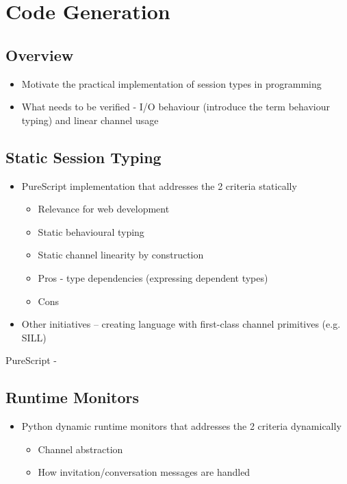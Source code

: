 \section{Code Generation}

\subsection{Overview}
\begin{itemize}
\item Motivate the practical implementation of session types in programming
\item What needs to be verified - I/O behaviour (introduce the term behaviour typing) and linear channel usage
\end{itemize}

\subsection{Static Session Typing}
\begin{itemize}
\item PureScript implementation that addresses the 2 criteria statically
\begin{itemize}
\item Relevance for web development
\item Static behavioural typing
\item Static channel linearity by construction
\item Pros - type dependencies (expressing dependent types)
\item Cons
\end{itemize}
\item Other initiatives -- creating language with first-class channel primitives (e.g. SILL)
\end{itemize}

PureScript - \cite{PureScript2019}

\subsection{Runtime Monitors}
\begin{itemize}
\item Python dynamic runtime monitors that addresses the 2 criteria dynamically
\begin{itemize}
\item Channel abstraction
\item How invitation/conversation messages are handled
\end{itemize}
\end{itemize}

